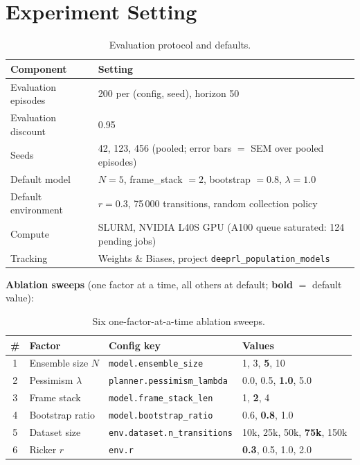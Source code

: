 \documentclass[11pt]{article}
\begin{document}
\section{Experiment Setting}

\begin{table}[H]
\centering
\begin{tabular}{>{\raggedright}p{}p{}}
\toprule
Component & Setting \\
\midrule
Evaluation episodes & 200 per (config, seed), horizon 50 \\
Evaluation discount & 0.95 \\
Seeds & 42, 123, 456 (pooled; error bars $=$ SEM over pooled episodes) \\
Default model & $N=5$, frame\_stack $=2$, bootstrap $=0.8$, $\lambda=1.0$ \\
Default environment & $r=0.3$, 75\,000 transitions, random collection policy \\
Compute & SLURM, NVIDIA L40S GPU (A100 queue saturated: 124 pending jobs) \\
Tracking & Weights \& Biases, project \texttt{deeprl\_population\_models} \\
\bottomrule
\end{tabular}
\caption{Evaluation protocol and defaults.}
\end{table}

\textbf{Ablation sweeps} (one factor at a time, all others at default;
\textbf{bold} $=$ default value):

\begin{table}[H]
\centering
\begin{tabular}{clll}
\toprule
\# & Factor & Config key & Values \\
\midrule
1 & Ensemble size $N$  & \texttt{model.ensemble\_size}      & 1, 3, \textbf{5}, 10 \\
2 & Pessimism $\lambda$ & \texttt{planner.pessimism\_lambda} & 0.0, 0.5, \textbf{1.0}, 5.0 \\
3 & Frame stack        & \texttt{model.frame\_stack\_len}   & 1, \textbf{2}, 4 \\
4 & Bootstrap ratio    & \texttt{model.bootstrap\_ratio}    & 0.6, \textbf{0.8}, 1.0 \\
5 & Dataset size       & \texttt{env.dataset.n\_transitions}& 10k, 25k, 50k, \textbf{75k}, 150k \\
6 & Ricker $r$         & \texttt{env.r}                     & \textbf{0.3}, 0.5, 1.0, 2.0 \\
\bottomrule
\end{tabular}
\caption{Six one-factor-at-a-time ablation sweeps.}
\end{table}
\end{document}
